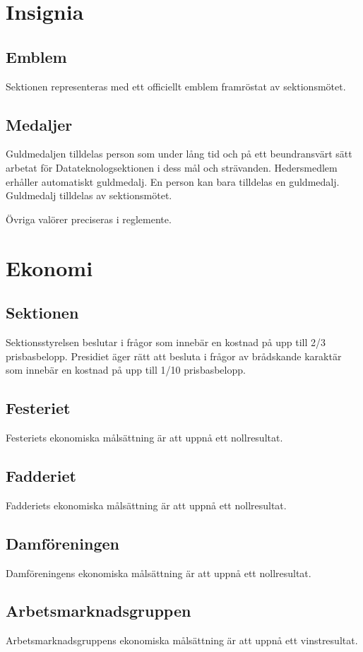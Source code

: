 \documentclass{datateknologsektionen-document}
\begin{document}
  \section{Insignia}
    \subsection{Emblem}
      Sektionen representeras med ett officiellt emblem framröstat av sektionsmötet.
    \subsection{Medaljer}
      \label{medaljer}
      Guldmedaljen tilldelas person som under lång tid och på ett beundransvärt sätt arbetat
      för Datateknologsektionen i dess mål och strävanden. Hedersmedlem erhåller
      automatiskt guldmedalj. En person kan bara tilldelas en guldmedalj. Guldmedalj tilldelas
      av sektionsmötet.
      
      Övriga valörer preciseras i reglemente.

  \section{Ekonomi}
    \subsection{Sektionen}
      \label{ekonomisektionen}
      Sektionsstyrelsen beslutar i frågor som innebär en kostnad på upp till 2/3 prisbasbelopp.
      Presidiet äger rätt att besluta i frågor av brådskande karaktär som innebär en kostnad på
      upp till 1/10 prisbasbelopp.
    \subsection{Festeriet}
      Festeriets ekonomiska målsättning är att uppnå ett nollresultat.
    \subsection{Fadderiet}
      Fadderiets ekonomiska målsättning är att uppnå ett nollresultat.
    \subsection{Damföreningen}
      Damföreningens ekonomiska målsättning är att uppnå ett nollresultat.
    \subsection{Arbetsmarknadsgruppen}
      Arbetsmarknadsgruppens ekonomiska målsättning är att uppnå ett vinstresultat.
\end{document}

